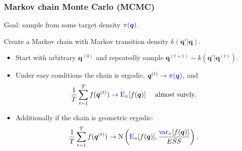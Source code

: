 \documentclass[xcolor=dvipsnames]{beamer}
\begin{document}
\begin{frame}
\frametitle{Markov chain Monte Carlo (MCMC)}
Goal: sample from some target density ${\color{blue}\pi(\bm{q})}$.\\

\vspace{0.5cm}

Create a Markov chain with Markov transition density $k(\bm{q}'|\bm{q})$.
\begin{itemize}
\item Start with arbitrary $\bm{q}^{(0)}$ and repeatedly sample $\bm{q}^{(t+1)} \sim k(\bm{q}'|\bm{q}^{(t)})$.\\

\vspace{0.2cm}

\item Under easy conditions the chain is {\color{red}ergodic}, $\bm{q}^{(t)} \to {\color{blue}\pi(\bm{q})}$, and
\begin{align*}
  \frac{1}{T}\sum_{t=1}^T f(\bm{q}^{(t)}) \to \mathrm{\color{blue}E}_{\color{blue}\pi}[f(\bm{q})]&& \mbox{ almost surely.}
\end{align*}

\vspace{0.2cm}

\item Additionally if the chain is {\color{red}geometric ergodic}:
\begin{align*}
  \frac{1}{T}\sum_{t=1}^T f(\bm{q}^{(t)}) \to \mathrm{N}\left(\mathrm{\color{blue}E}_{\color{blue}\pi}[f(\bm{q})], \frac{\mathrm{\color{blue}var}_{\color{blue}\pi}[f(\bm{q})]}{ESS}\right).
\end{align*}
\end{itemize}
\end{frame}
\end{document}
